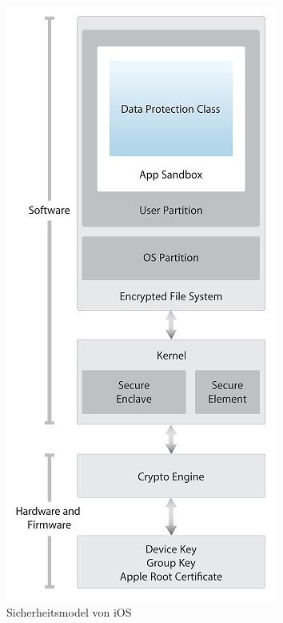 	\begin{figure}
		\includegraphics[width=\linewidth]{ios/media/security-model.jpg}
		\caption{Sicherheitsmodel von iOS}
		\label{fig:security-model}
	\end{figure}

